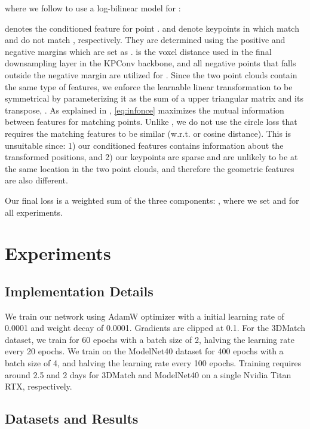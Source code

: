\documentclass[10pt,twocolumn,letterpaper]{article}
\begin{document}
where we follow \cite{oord2018infonce} to use a log-bilinear model for :

 denotes the conditioned feature for point .  and  denote keypoints in  which match and do not match , respectively. They are determined using the positive and negative margins  which are set as .  is the voxel distance used in the final downsampling layer in the KPConv backbone, and all negative points that falls outside the negative margin are utilized for . 
Since the two point clouds contain the same type of features, we enforce the learnable linear transformation  to be symmetrical by parameterizing it as the sum of a upper triangular matrix  and its transpose, \ie .
As explained in \cite{oord2018infonce}, \cref{eq:infonce} maximizes the mutual information between features for matching points. Unlike \cite{bai2020d3feat,huang2021predator}, we do not use the circle loss \cite{sun2020circle} that requires the matching features to be similar (w.r.t.  or cosine distance). This is unsuitable since: 1) our conditioned features contains information about the transformed positions, and 2) our keypoints are sparse and are unlikely to be at the same location in the two point clouds, and therefore the geometric features are also different. 


\medskip
Our final loss is a weighted sum of the three components: , where we set  and  for all experiments.


\section{Experiments}
\subsection{Implementation Details}
We train our network using AdamW \cite{loshchilov2019adamw} optimizer with a initial learning rate of 0.0001 and weight decay of 0.0001. Gradients are clipped at 0.1. For the 3DMatch dataset, we train for 60 epochs with a batch size of 2, halving the learning rate every 20 epochs. We train on the ModelNet40 dataset for 400 epochs with a batch size of 4, and halving the learning rate every 100 epochs. Training requires around 2.5 and 2 days for 3DMatch and ModelNet40 on a single Nvidia Titan RTX, respectively.


\subsection{Datasets and Results}
\end{document}
